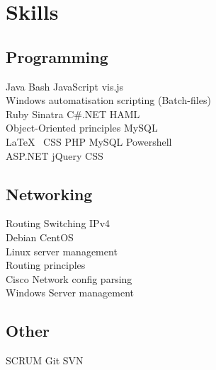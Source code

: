 \documentclass[a4paper]{deedy-resume} %
\begin{document}
\begin{minipage}[t]{0.33\textwidth} %


\section{Skills}

\subsection{Programming}

Java \textbullet{} Bash \textbullet{} JavaScript\textbullet{} vis.js \\ Windows automatisation scripting (Batch-files) \\ 
Ruby \textbullet{} Sinatra \textbullet{} C\#.NET  \textbullet{} HAML \\ Object-Oriented principles \textbullet{} MySQL \\

\vspace{\topsep} %
\LaTeX\ \textbullet{} CSS \textbullet{} PHP \textbullet{} MySQL \textbullet{} Powershell \\
ASP.NET \textbullet jQuery \textbullet CSS 

\sectionspace %

\subsection{Networking}

Routing \textbullet{} Switching \textbullet{} IPv4 \\ 
Debian \textbullet{} CentOS \\ Linux server management \\ Routing principles \\ Cisco \textbullet{} Network config parsing \\ Windows Server management\\

\sectionspace %

\subsection{Other}
SCRUM \textbullet{} Git \textbullet SVN \\


\end{minipage}
\end{document}
